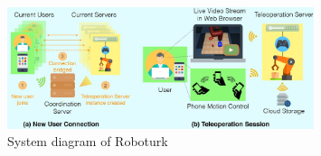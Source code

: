  \begin{figure}[htbp]
         \centering
         \includegraphics[width=0.8\textwidth]{Figures/images/indirect_demonstration/roboturk.jpg}
         \caption{System diagram of Roboturk \cite{mandlekar2018roboturk}}
         \label{fig:roboturk}
\end{figure}

